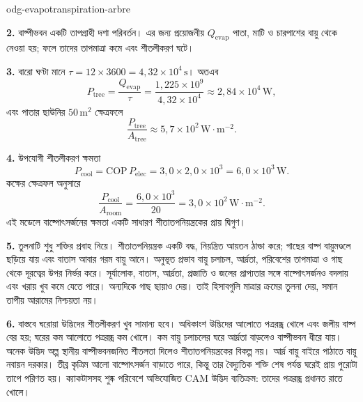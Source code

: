 \begin{exo}{odg-evapotranspiration-arbre}
\begin{solution}
\textbf{2.} বাষ্পীভবন একটি তাপগ্রাহী দশা পরিবর্তন। এর জন্য প্রয়োজনীয় $Q_{\mathrm{evap}}$ পাতা, মাটি ও চারপাশের বায়ু থেকে নেওয়া হয়; ফলে তাদের তাপমাত্রা কমে এবং শীতলীকরণ ঘটে।

\textbf{3.} বারো ঘণ্টা মানে $\tau=12\times3600=4{,}32\times10^4\,\text{s}$। অতএব
\[
P_{\mathrm{tree}}=\frac{Q_{\mathrm{evap}}}{\tau}
=\frac{1{,}225\times10^9}{4{,}32\times10^4}
\approx2{,}84\times10^4\,\text{W},
\]
এবং পাতার ছাউনির $50\,\text{m}^2$ ক্ষেত্রফলে
\[
\frac{P_{\mathrm{tree}}}{A_{\mathrm{tree}}}\approx5{,}7\times10^2\,\text{W}\!\cdot\!\text{m}^{-2}.
\]

\textbf{4.} উপযোগী শীতলীকরণ ক্ষমতা
\[
P_{\mathrm{cool}}=\mathrm{COP}\,P_{\mathrm{elec}}=3{,}0\times2{,}0\times10^3=6{,}0\times10^3\,\text{W}.
\]
কক্ষের ক্ষেত্রফল অনুসারে
\[
\frac{P_{\mathrm{cool}}}{A_{\mathrm{room}}}=\frac{6{,}0\times10^3}{20}=3{,}0\times10^2\,\text{W}\!\cdot\!\text{m}^{-2}.
\]
এই মডেলে বাষ্পোৎসর্জনের ক্ষমতা একটি সাধারণ শীতাতপনিয়ন্ত্রকের প্রায় দ্বিগুণ।

\textbf{5.} তুলনাটি শুধু শক্তির প্রবাহ নিয়ে। শীতাতপনিয়ন্ত্রক একটি বদ্ধ, নিয়ন্ত্রিত আয়তন ঠান্ডা করে; গাছের বাষ্প বায়ুমণ্ডলে ছড়িয়ে যায় এবং বাতাস আবার গরম বায়ু আনে। অনুভূত প্রভাব বায়ু চলাচল, আর্দ্রতা, পরিবেশের তাপমাত্রা ও গাছ থেকে দূরত্বের উপর নির্ভর করে। সূর্যালোক, বাতাস, আর্দ্রতা, প্রজাতি ও জলের প্রাপ্যতার সঙ্গে বাষ্পোৎসর্জনও বদলায় এবং খরায় খুব কমে যেতে পারে। অন্যদিকে গাছ ছায়াও দেয়। তাই হিসাবগুলি মাত্রার ক্রমের তুলনা দেয়, সমান তাপীয় আরামের নিশ্চয়তা নয়।

\textbf{6.} বাস্তবে ঘরোয়া উদ্ভিদের শীতলীকরণ খুব সামান্য হবে। অধিকাংশ উদ্ভিদের আলোতে পত্ররন্ধ্র খোলে এবং জলীয় বাষ্প বের হয়; ঘরের কম আলোতে পত্ররন্ধ্র কম খোলে। কম বায়ু চলাচলের ঘরে আর্দ্রতা বাড়লেও বাষ্পীভবন ধীরে যায়। অনেক উদ্ভিদ অল্প স্থানীয় বাষ্পীভবনজনিত শীতলতা দিলেও শীতাতপনিয়ন্ত্রকের বিকল্প নয়। আর্দ্র বায়ু বাইরে পাঠাতে বায়ু নবায়ন দরকার। তীব্র কৃত্রিম আলো বাষ্পোৎসর্জন বাড়াতে পারে, কিন্তু তার বৈদ্যুতিক শক্তি শেষ পর্যন্ত ঘরেই প্রায় পুরোটা তাপে পরিণত হয়। ক্যাকটাসসহ শুষ্ক পরিবেশে অভিযোজিত CAM উদ্ভিদ ব্যতিক্রম: তাদের পত্ররন্ধ্র প্রধানত রাতে খোলে।
\end{solution}
\end{exo}

